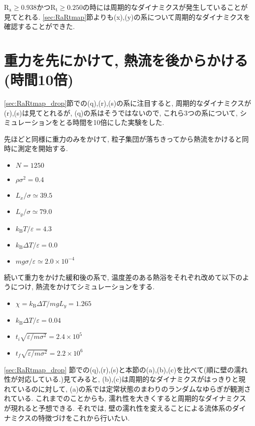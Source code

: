 $\text{R}_\text{a} \ge 0.938 かつ\text{R}_\text{t} \ge 0.250$の時には周期的なダイナミクスが発生していることが見てとれる. \ref{sec:RaRtmap}節よりも(x),(y)の系について周期的なダイナミクスを確認することができた. 

\section{重力を先にかけて, 熱流を後からかける(時間10倍)}\label{sec:RaRtmap10_drop}

\ref{sec:RaRtmap_drop}節での(q),(r),(s)の系に注目すると, 周期的なダイナミクスが(r),(s)は見てとれるが, (q)の系はそうではないので, これら3つの系について, シミュレーションをとる時間を10倍にした実験をした. 

先ほどと同様に重力のみをかけて, 粒子集団が落ちきってから熱流をかけると同時に測定を開始する.

\begin{itemize}
  \item $N = 1250$
  \item $\rho \sigma^2 = 0.4$
  \item $L_x / \sigma \simeq 39.5$
  \item $L_y / \sigma \simeq 79.0$
  \item $k_{\text{B}} T/\varepsilon = 4.3$
  \item $k_{\text{B}} \Delta T/\varepsilon = 0.0$
  \item $mg\sigma/\varepsilon \simeq 2.0 \times 10^{-4}$
\end{itemize}

続いて重力をかけた緩和後の系で, 温度差のある熱浴をそれぞれ改めて以下のようにつけ, 熱流をかけてシミュレーションをする. 

\begin{itemize}
  \item $\chi = k_{\text{B}}\Delta T / mg L_y = 1.265$
  \item $k_{\text{B}} \Delta T/\varepsilon = 0.04$
  \item $t_i \sqrt{\varepsilon / m \sigma^2} = 2.4 \times 10^{5}$
  \item $t_f \sqrt{\varepsilon / m \sigma^2} = 2.2 \times 10^{6}$
\end{itemize}



\ref{sec:RaRtmap_drop} 節での(q),(r),(s)と本節の(a),(b),(c)を比べて(順に壁の濡れ性が対応している.)見てみると, (b),(c)は周期的なダイナミクスがはっきりと現れているのに対して, (a)の系では定常状態のまわりのランダムなゆらぎが観測されている. これまでのことからも, 濡れ性を大きくすると周期的なダイナミクスが現れると予想できる. それでは, 壁の濡れ性を変えることによる流体系のダイナミクスの特徴づけをこれから行いたい. 
